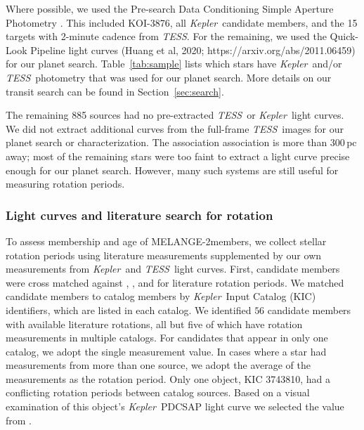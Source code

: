 \documentclass[twocolumn]{aastex631}
\newcommand{\starname}{KOI-3876}
\newcommand{\kepler}{{\it Kepler}}
\newcommand{\tess}{\textit{TESS}}
\newcommand{\association}{MELANGE-2}
\begin{document}

Where possible, we used the Pre-search Data Conditioning Simple Aperture Photometry \citep[PDCSAP;][]{Smith2012, Stumpe2012}. This included \starname, all \kepler\ candidate members, and the 15 targets with 2-minute cadence from \tess. For the remaining, we used the Quick-Look Pipeline light curves (Huang et al, 2020; https://arxiv.org/abs/2011.06459) for our planet search. Table~\ref{tab:sample} lists which stars have \kepler\ and/or \tess\ photometry that was used for our planet search. More details on our transit search can be found in Section~\ref{sec:search}.

The remaining 885 sources had no pre-extracted \tess\ or \kepler\ light curves. We did not extract additional curves from the full-frame \tess\ images for our planet search or characterization. The association association is more than 300\,pc away; most of the remaining stars were too faint to extract a light curve precise enough for our planet search. However, many such systems are still useful for measuring rotation periods.


\subsubsection{Light curves and literature search for rotation}\label{sub:rot_collection}

To assess membership and age of \association members, we collect stellar rotation periods using literature measurements supplemented by our own measurements from \kepler\ and \tess\ light curves. First, candidate members were cross matched against \citet{Nielsen:2013}, \citet{McQuillan2013, 2014ApJS..211...24M}, and \citet{Santos2019, Santos2021} for literature rotation periods. We matched candidate members to catalog members by \kepler\ Input Catalog (KIC) identifiers, which are listed in each catalog. We identified $56$ candidate members with available literature rotations, all but five of which have rotation measurements in multiple catalogs. For candidates that appear in only one catalog, we adopt the single measurement value. In cases where a star had measurements from more than one source, we adopt the average of the measurements as the rotation period. Only one object, KIC 3743810, had a conflicting rotation periods between catalog sources. Based on a visual examination of this object's \kepler\ PDCSAP light curve we selected the value from \citet{Nielsen:2013}.
\end{document}
